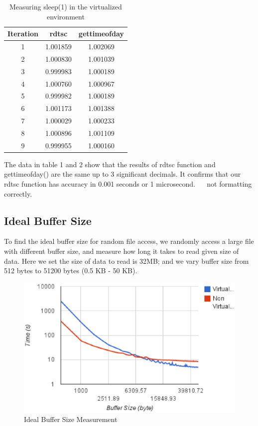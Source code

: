 \begin{table}[!thb]
\centering
\begin{tabular}{|c|c|c|} \hline
Iteration & rdtsc & gettimeofday \\ \hline
1 & 1.001859 & 1.002069 \\ \hline
2 & 1.000830 & 1.001039 \\ \hline
3 & 0.999983 & 1.000189 \\ \hline
4 & 1.000760 & 1.000967 \\ \hline
5 & 0.999982 & 1.000189 \\ \hline
6 & 1.001173 & 1.001388 \\ \hline
7 & 1.000029 & 1.000233 \\ \hline
8 & 1.000896 & 1.001109 \\ \hline
9 & 0.999955 & 1.000160 \\ \hline
\end{tabular}
\label{tab:cali_virtual}
\caption{Measuring sleep(1) in the virtualized environment}
\end{table}

The data in table 1 and 2 show that the results of rdtsc function and gettimeofday() are the same up to 3 significant decimals. It confirms that our rdtsc function has accuracy in 0.001 seconds or 1 microsecond.
  
not formatting correctly.

\subsection{Ideal Buffer Size}
To find the ideal buffer size for random file access, we randomly access a large file with different buffer size, and measure how long it takes to read given size of data. Here we set the size of data to read is 32MB; and we vary buffer size from 512 bytes to 51200 bytes (0.5 KB - 50 KB). 

\begin{figure}
\centering
\includegraphics[width=.65\textwidth]{figures/buffer_size.eps}
\caption{Ideal Buffer Size Measurement}
\label{fig:buffer_size}
\end{figure}

